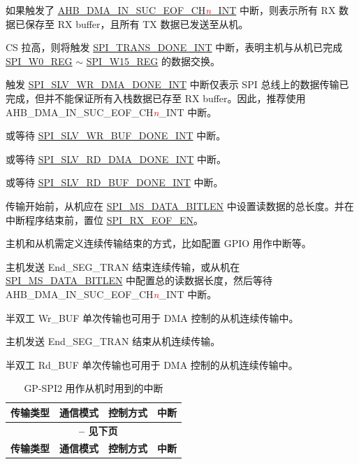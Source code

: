 \documentclass[main\_\_CN.tex]{subfiles}
\begin{document}
\begin{ThreePartTable}

\begin{TableNotes}
    \item[1] 如果触发了 \hyperref[int:GDMAINSUCEOFINT]{AHB\_DMA\_IN\_SUC\_EOF\_CH\textcolor{red}{\it{n}}\_INT} 中断，则表示所有 RX 数据已保存至 RX buffer，且所有 TX 数据已发送至从机。
    \item[2] CS 拉高，则将触发  \hyperref[int:SPITRANSDONEINT]{SPI\_TRANS\_DONE\_INT} 中断，表明主机与从机已完成  \hyperref[regdesc:SPIW0REG]{SPI\_W0\_REG} $\sim$ \hyperref[regdesc:SPIW15REG]{SPI\_W15\_REG} 的数据交换。
    \item[3] 触发  \hyperref[int:SPISLVWRDMADONEINT]{SPI\_SLV\_WR\_DMA\_DONE\_INT} 中断仅表示 SPI 总线上的数据传输已完成，但并不能保证所有入栈数据已存至 RX buffer。因此，推荐使用 AHB\_DMA\_IN\_SUC\_EOF\_CH\textcolor{red}{\it{n}}\_INT 中断。
    \item[4] 或等待 \hyperref[int:SPISLVWRBUFDONEINT]{SPI\_SLV\_WR\_BUF\_DONE\_INT} 中断。
    \item[5] 或等待 \hyperref[int:SPISLVRDDMADONEINT]{SPI\_SLV\_RD\_DMA\_DONE\_INT} 中断。
    \item[6] 或等待 \hyperref[int:SPISLVRDBUFDONEINT]{SPI\_SLV\_RD\_BUF\_DONE\_INT} 中断。
    \item[7] 传输开始前，从机应在  \hyperref[fielddesc:SPIMSDATABITLEN]{SPI\_MS\_DATA\_BITLEN} 中设置读数据的总长度。并在中断程序结束前，置位 \hyperref[fielddesc:SPIRXEOFEN]{SPI\_RX\_EOF\_EN}。
    \item[8] 主机和从机需定义连续传输结束的方式，比如配置 GPIO 用作中断等。
    \item[9] 主机发送 End\_SEG\_TRAN 结束连续传输，或从机在  \hyperref[fielddesc:SPIMSDATABITLEN]{SPI\_MS\_DATA\_BITLEN} 中配置总的读数据长度，然后等待 AHB\_DMA\_IN\_SUC\_EOF\_CH\textcolor{red}{\it{n}}\_INT 中断。
    \item[10] 半双工 Wr\_BUF 单次传输也可用于 DMA 控制的从机连续传输中。
    \item[11] 主机发送 End\_SEG\_TRAN 结束从机连续传输。
    \item[12] 半双工 Rd\_BUF 单次传输也可用于 DMA 控制的从机连续传输中。
\end{TableNotes}
\begin{longtable}[c]{|c|l|l|l|}
\caption{GP-SPI2 用作从机时用到的中断}\label{tab:slave-interrupts}
\\
\hline

\rowcolor{lightgray}
\textbf{传输类型 } & \textbf{ 通信模式} & \textbf{ 控制方式} & \textbf{ 中断 } \\\hline
    \endfirsthead
    \multicolumn{4}{c}{\bfseries \tablename\ \thetable{} -- 见下页}\\\hline
    \rowcolor{lightgray}
    \textbf{传输类型 } & \textbf{ 通信模式} & \textbf{ 控制方式} & \textbf{ 中断 }\\\hline
    \endhead
    

\end{longtable}
\end{ThreePartTable}
\end{document}

